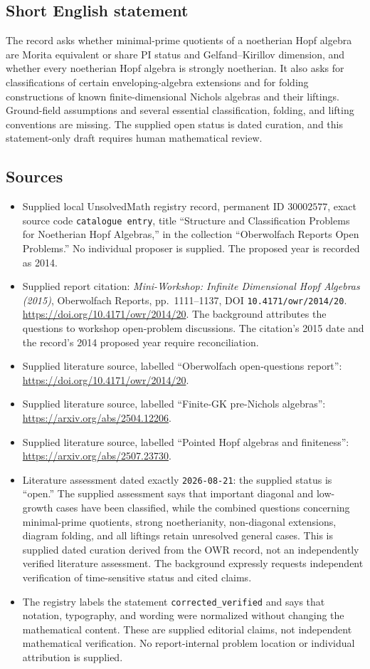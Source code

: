 \documentclass[11pt]{article}
\begin{document}
\subsection{Short English statement}
The record asks whether minimal-prime quotients of a noetherian Hopf algebra are Morita equivalent or share PI status and Gelfand--Kirillov dimension, and whether every noetherian Hopf algebra is strongly noetherian. It also asks for classifications of certain enveloping-algebra extensions and for folding constructions of known finite-dimensional Nichols algebras and their liftings. Ground-field assumptions and several essential classification, folding, and lifting conventions are missing. The supplied open status is dated curation, and this statement-only draft requires human mathematical review.
\subsection{Sources}
\begin{itemize}
\item Supplied local UnsolvedMath registry record, permanent ID \(30002577\), exact source code \texttt{catalogue entry}, title ``Structure and Classification Problems for Noetherian Hopf Algebras,'' in the collection ``Oberwolfach Reports Open Problems.'' No individual proposer is supplied. The proposed year is recorded as 2014.
\item Supplied report citation: \emph{Mini-Workshop: Infinite Dimensional Hopf Algebras (2015)}, Oberwolfach Reports, pp.~1111--1137, DOI \texttt{10.4171/owr/2014/20}. \url{https://doi.org/10.4171/owr/2014/20}. The background attributes the questions to workshop open-problem discussions. The citation's 2015 date and the record's 2014 proposed year require reconciliation.
\item Supplied literature source, labelled ``Oberwolfach open-questions report'': \url{https://doi.org/10.4171/owr/2014/20}.
\item Supplied literature source, labelled ``Finite-GK pre-Nichols algebras'': \url{https://arxiv.org/abs/2504.12206}.
\item Supplied literature source, labelled ``Pointed Hopf algebras and finiteness'': \url{https://arxiv.org/abs/2507.23730}.
\item Literature assessment dated exactly \texttt{2026-08-21}: the supplied status is ``open.'' The supplied assessment says that important diagonal and low-growth cases have been classified, while the combined questions concerning minimal-prime quotients, strong noetherianity, non-diagonal extensions, diagram folding, and all liftings retain unresolved general cases. This is supplied dated curation derived from the OWR record, not an independently verified literature assessment. The background expressly requests independent verification of time-sensitive status and cited claims.
\item The registry labels the statement \texttt{corrected\_verified} and says that notation, typography, and wording were normalized without changing the mathematical content. These are supplied editorial claims, not independent mathematical verification. No report-internal problem location or individual attribution is supplied.
\end{itemize}
\end{document}
